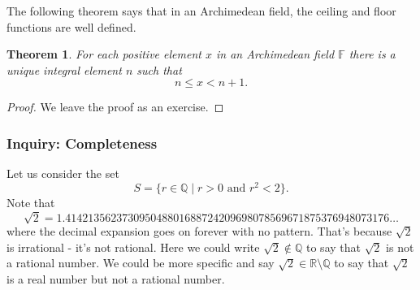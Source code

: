 \documentclass[11pt]{article}
\newenvironment{task}
	{\begin{mdframed}[linecolor=lightgray, linewidth=3pt]\raggedright}
	{\end{mdframed}}
\newtheorem{theorem}{Theorem}[section]
\theoremstyle{definition}
\begin{document}
The following theorem says that in an Archimedean field, the ceiling and floor functions are well defined.

\begin{theorem}
  For each positive element $x$ in an Archimedean field $\mathbb{F}$ there is a unique integral element $n$ such that
  \[ n \leq x < n + 1.\]
  \label{theorem: archimedean implies unique integral element}
\end{theorem}
\begin{proof}
  We leave the proof as an exercise.
\end{proof}

\subsubsection{Inquiry: Completeness}
\begin{task}
  Let us consider the set
  \[ S = \{ r\in \mathbb{Q} \mid r > 0 \text{ and } r^2 < 2 \}. \]
  Note that 
  \[ \sqrt{2} = 1.414213562373095048801688724209698078569671875376948073176\dots\]
  where the decimal expansion goes on forever with no pattern. That's because $\sqrt{2}$ is irrational - it's not rational. Here we could
  write $\sqrt{2}\not\in\mathbb{Q}$ to say that $\sqrt{2}$ is not a rational number. We could be more specific and say
  $\sqrt{2}\in\mathbb{R}\setminus \mathbb{Q}$ to say that $\sqrt{2}$ is a real number but not a rational number.


\end{task}
\end{document}
